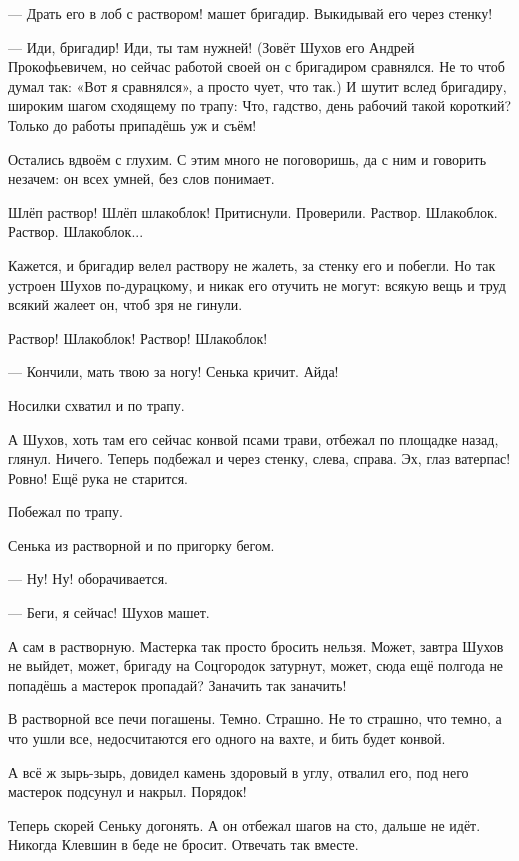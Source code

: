 --- Драть его в лоб с раствором! \dash машет бригадир. \Dash Выкидывай его через стенку!

--- Иди, бригадир! Иди, ты там нужней! \dash (Зовёт Шухов его Андрей Прокофьевичем, но сейчас
работой своей он с бригадиром сравнялся. Не то чтоб думал так: «Вот я сравнялся», а просто
чует, что так.) И шутит вслед бригадиру, широким шагом сходящему по трапу: \Dash Что, гадство, день
рабочий такой короткий? Только до работы припадёшь \dash уж и съём!

Остались вдвоём с глухим. С этим много не поговоришь, да с ним и говорить незачем: он всех
умней, без слов понимает.

Шлёп раствор! Шлёп шлакоблок! Притиснули. Проверили. Раствор. Шлакоблок. Раствор. Шлакоблок...

Кажется, и бригадир велел \dash раствору не жалеть, за стенку его \dash и побегли. Но так устроен
Шухов по-дурацкому, и никак его отучить не могут: всякую вещь и труд всякий жалеет он, чтоб
зря не гинули.

Раствор! Шлакоблок! Раствор! Шлакоблок!

--- Кончили, мать твою за ногу! \dash Сенька кричит. \Dash Айда!

Носилки схватил \dash и по трапу.

А Шухов, хоть там его сейчас конвой псами трави, отбежал по площадке назад, глянул. Ничего.
Теперь подбежал \dash и через стенку, слева, справа. Эх, глаз \dash ватерпас! Ровно! Ещё рука не
старится.

Побежал по трапу.

Сенька \dash из растворной и по пригорку бегом.

--- Ну! Ну! \dash оборачивается.

--- Беги, я сейчас! \dash Шухов машет.

А сам \dash в растворную. Мастерка так просто бросить нельзя. Может, завтра Шухов не выйдет,
может, бригаду на Соцгородок затурнут, может, сюда ещё полгода не попадёшь \dash а мастерок
пропадай? Заначить так заначить!

В растворной все печи погашены. Темно. Страшно. Не то страшно, что темно, а что ушли все,
недосчитаются его одного на вахте, и бить будет конвой.

А всё ж зырь-зырь, довидел камень здоровый в углу, отвалил его, под него мастерок подсунул и
накрыл. Порядок!

Теперь скорей Сеньку догонять. А он отбежал шагов на сто, дальше не идёт. Никогда Клевшин в
беде не бросит. Отвечать \dash так вместе.

